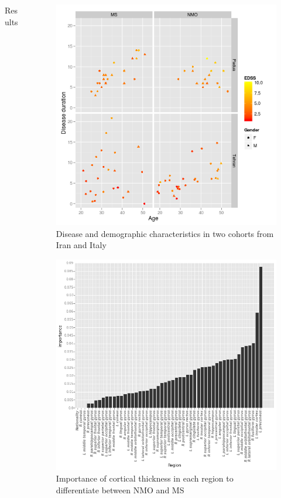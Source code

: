 \documentclass[final]{beamer}
\newlength{\onecolwid}
\newlength{\twocolwid}
\begin{document}
\begin{frame}[t]
\begin{columns}[t]
\begin{column}{\twocolwid}
\begin{columns}[t,totalwidth=\twocolwid]
\begin{column}{\onecolwid}
\begin{block}{Results}
\end{block}


\end{column} %

\begin{column}{\onecolwid}\vspace{-.6in} %

\begin{figure}
\includegraphics[width=0.6\linewidth]{descriptive_statistics_v2.png}
\caption{Disease and demographic characteristics in two cohorts from Iran and Italy}
\end{figure}

\begin{figure}
\includegraphics[width=0.7\linewidth]{v3_thickness_importance.png}
\caption{Importance of cortical thickness in each region to differentiate between NMO and MS}
\end{figure}


\end{column}
\end{columns}
\end{column}
\end{columns}
\end{frame}
\end{document}
